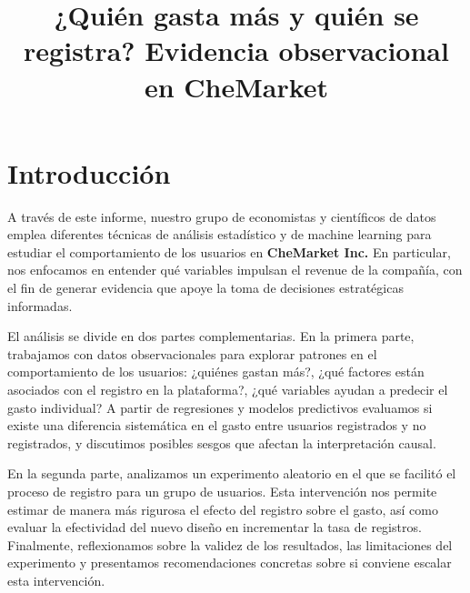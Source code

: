 \documentclass[conference]{IEEEtran}
\begin{document}
\title{¿Quién gasta más y quién se registra? Evidencia observacional en CheMarket}

\author{%
\and
{}
\and
{}
}



\maketitle


\section{Introducción}
A través de este informe, nuestro grupo de economistas y científicos de datos emplea diferentes técnicas de análisis estadístico y de machine learning para estudiar el comportamiento de los usuarios en \textbf{CheMarket Inc.} En particular, nos enfocamos en entender qué variables impulsan el revenue de la compañía, con el fin de generar evidencia que apoye la toma de decisiones estratégicas informadas.

El análisis se divide en dos partes complementarias. En la primera parte, trabajamos con datos observacionales para explorar patrones en el comportamiento de los usuarios: ¿quiénes gastan más?, ¿qué factores están asociados con el registro en la plataforma?, ¿qué variables ayudan a predecir el gasto individual? A partir de regresiones y modelos predictivos evaluamos si existe una diferencia sistemática en el gasto entre usuarios registrados y no registrados, y discutimos posibles sesgos que afectan la interpretación causal.

En la segunda parte, analizamos un experimento aleatorio en el que se facilitó el proceso de registro para un grupo de usuarios. Esta intervención nos permite estimar de manera más rigurosa el efecto del registro sobre el gasto, así como evaluar la efectividad del nuevo diseño en incrementar la tasa de registros. Finalmente, reflexionamos sobre la validez de los resultados, las limitaciones del experimento y presentamos recomendaciones concretas sobre si conviene escalar esta intervención.
\end{document}
